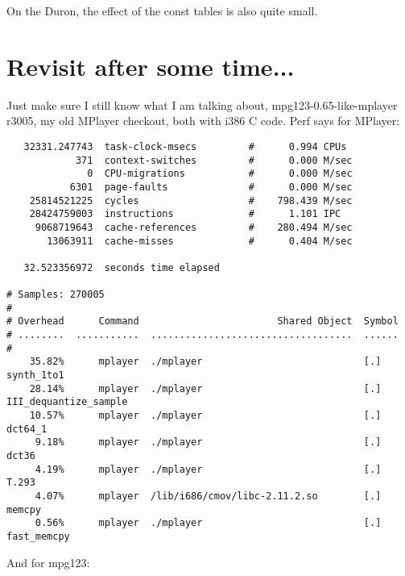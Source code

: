 \documentclass[a4paper,12pt]{scrartcl}
\begin{document}
On the Duron, the effect of the const tables is also quite small.

\section{Revisit after some time...}

Just make sure I still know what I am talking about, mpg123-0.65-like-mplayer r3005, my old MPlayer checkout, both with i386 C code. Perf says for MPlayer:
\begin{verbatim}
   32331.247743  task-clock-msecs         #      0.994 CPUs 
            371  context-switches         #      0.000 M/sec
              0  CPU-migrations           #      0.000 M/sec
           6301  page-faults              #      0.000 M/sec
    25814521225  cycles                   #    798.439 M/sec
    28424759003  instructions             #      1.101 IPC  
     9068719643  cache-references         #    280.494 M/sec
       13063911  cache-misses             #      0.404 M/sec

   32.523356972  seconds time elapsed

# Samples: 270005
#
# Overhead      Command                        Shared Object  Symbol
# ........  ...........  ...................................  ......
#
    35.82%      mplayer  ./mplayer                            [.] synth_1to1
    28.14%      mplayer  ./mplayer                            [.] III_dequantize_sample
    10.57%      mplayer  ./mplayer                            [.] dct64_1
     9.18%      mplayer  ./mplayer                            [.] dct36
     4.19%      mplayer  ./mplayer                            [.] T.293
     4.07%      mplayer  /lib/i686/cmov/libc-2.11.2.so        [.] memcpy
     0.56%      mplayer  ./mplayer                            [.] fast_memcpy
\end{verbatim}
And for mpg123:
\end{document}
